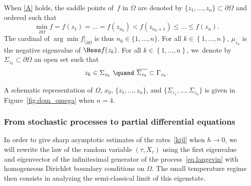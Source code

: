 \begin{definition}\label{eq.de-introd}
When \ref{A} holds, the saddle points of~$f$ in $\overline{\Omega}$ are denoted by $\{z_1,\ldots,z_n\} \subset
\partial \Omega$ and ordered such that
\begin{equation}\label{eq.n0}
\min_{\partial \Omega}f=f(z_1)=\ldots
= f(z_{n_0}) < f(z_{n_0+1}) \le \ldots \leq f(z_n).
\end{equation}
The cardinal of $\arg\min f|_{\partial \Omega}$ is thus $n_0 \in \{1,
\ldots, n\}$. For all $k\in \left\{1,\ldots,n\right\}$, $\mu_{z_k}$ is the negative eigenvalue of $\Hess f (z_k)$.
For all $k\in \left\{1,\ldots,n\right\}$, we~denote by
$\Sigma_{z_k} \subset \partial \Omega$ an open set such that
\begin{equation}\label{Sigma_k}
z_k \in \Sigma_{z_k} \ \quand \ \overline{\Sigma_{z_k} }\subset \Gamma_{z_k}.
\end{equation}
\end{definition}

A schematic representation of $\Omega$, $x_0$, $\{z_1,\ldots,z_n\}$, and $\{\Sigma_{z_1},\ldots, \Sigma_{z_n}\}$ is given in Figure~\ref{fig:dom_omega} when $n=4$.

\subsubsection{From stochastic processes to partial differential equations}
\label{sec.diri}

In order to give sharp asymptotic estimates of the rates~\eqref{kijl}
when $h \to 0$, we
will rewrite the law of the random variable $(\tau,X_\tau)$ using the
first eigenvalue and eigenvector of the infinitesimal generator of the
process~\eqref{eq.langevin} with homogeneous Dirichlet boundary
conditions on $\Omega$. The small temperature regime then consists in
analyzing the semi-classical limit of this eigenstate.

